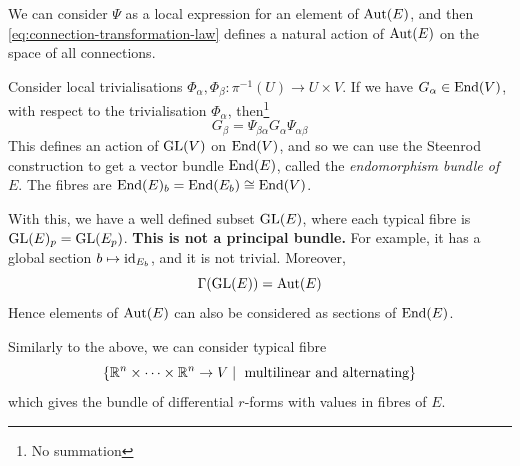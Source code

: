 \documentclass{article}
\begin{document}
\begin{remark}
    We can consider \(\Psi\) as a local expression for an element of \(\operatorname{Aut}(E)\), and then \cref{eq:connection-transformation-law} defines a natural action of \(\operatorname{Aut}(E)\) on the space of all connections.
\end{remark}

Consider local trivialisations \(\Phi_\alpha, \Phi_\beta : \pi^{-1}(U) \to U \times V\). If we have \(G_\alpha \in \operatorname{End}(V)\), with respect to the trivialisation \(\Phi_\alpha\), then\footnote{No summation}
\[G_\beta = \Psi_{\beta\alpha}G_\alpha\Psi_{\alpha\beta}\]
This defines an action of \(\operatorname{GL}(V)\) on \(\operatorname{End}(V)\), and so we can use the Steenrod construction to get a vector bundle \(\operatorname{End}(E)\), called the \emph{endomorphism bundle of \(E\)}. The fibres are \(\operatorname{End}(E)_b = \operatorname{End}(E_b) \cong \operatorname{End}(V)\).

With this, we have a well defined subset \(\operatorname{GL}(E)\), where each typical fibre is \(\operatorname{GL}(E)_p = \operatorname{GL}(E_p)\). \textbf{This is not a principal bundle.} For example, it has a global section \(b \mapsto \operatorname{id}_{E_b}\), and it is not trivial. Moreover,
\[\Gamma(\operatorname{GL}(E)) = \operatorname{Aut}(E)\]
Hence elements of \(\operatorname{Aut}(E)\) can also be considered as sections of \(\operatorname{End}(E)\).

Similarly to the above, we can consider typical fibre
\[\{\mathbb{R}^n \times \cdots \times \mathbb{R}^n \to V \mid \text{ multilinear and alternating}\}\]
which gives the bundle of differential \(r\)-forms with values in fibres of \(E\).
\end{document}
